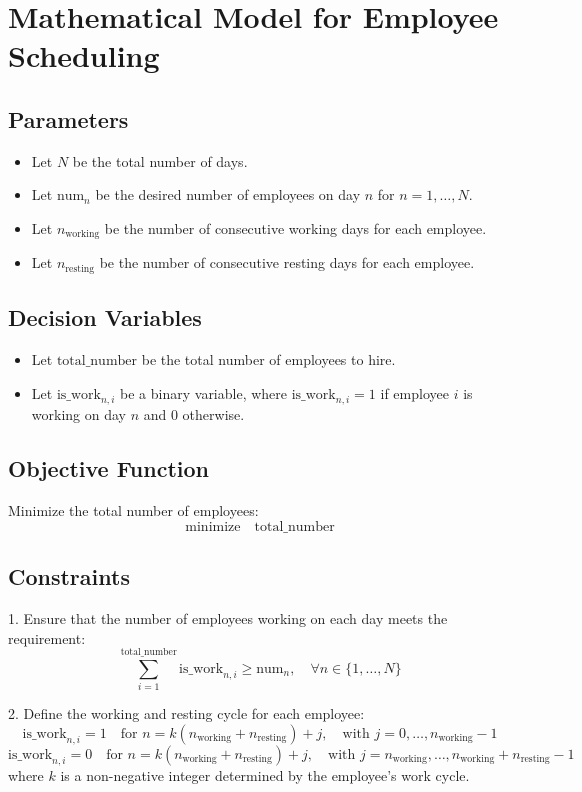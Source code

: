 \documentclass{article}
\begin{document}
\section*{Mathematical Model for Employee Scheduling}

\subsection*{Parameters}
\begin{itemize}
    \item Let \( N \) be the total number of days.
    \item Let \( \text{num}_{n} \) be the desired number of employees on day \( n \) for \( n = 1, \ldots, N \).
    \item Let \( n_{\text{working}} \) be the number of consecutive working days for each employee.
    \item Let \( n_{\text{resting}} \) be the number of consecutive resting days for each employee.
\end{itemize}

\subsection*{Decision Variables}
\begin{itemize}
    \item Let \( \text{total\_number} \) be the total number of employees to hire.
    \item Let \( \text{is\_work}_{n, i} \) be a binary variable, where \( \text{is\_work}_{n, i} = 1 \) if employee \( i \) is working on day \( n \) and \( 0 \) otherwise.
\end{itemize}

\subsection*{Objective Function}
Minimize the total number of employees:
\[
\text{minimize} \quad \text{total\_number}
\]

\subsection*{Constraints}
1. Ensure that the number of employees working on each day meets the requirement:
\[
\sum_{i=1}^{\text{total\_number}} \text{is\_work}_{n, i} \geq \text{num}_{n}, \quad \forall n \in \{1, \ldots, N\}
\]

2. Define the working and resting cycle for each employee:
\[
\text{is\_work}_{n, i} = 1 \quad \text{for } n = k(n_{\text{working}} + n_{\text{resting}}) + j, \quad \text{with } j = 0, \ldots, n_{\text{working}} - 1
\]
\[
\text{is\_work}_{n, i} = 0 \quad \text{for } n = k(n_{\text{working}} + n_{\text{resting}}) + j, \quad \text{with } j = n_{\text{working}}, \ldots, n_{\text{working}} + n_{\text{resting}} - 1
\]
where \( k \) is a non-negative integer determined by the employee's work cycle.
\end{document}
